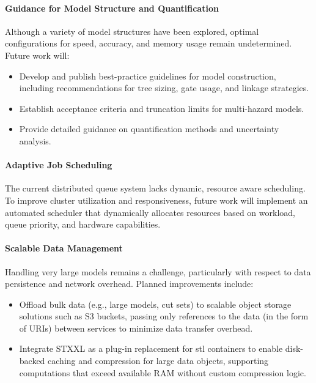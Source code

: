\paragraph{Guidance for Model Structure and Quantification}

Although a variety of model structures have been explored, optimal configurations for speed, accuracy, and memory usage remain undetermined. Future work will:
\begin{itemize}
    \item Develop and publish best-practice guidelines for model construction, including recommendations for tree sizing, gate usage, and linkage strategies.
    \item Establish acceptance criteria and truncation limits for multi-hazard models.
    \item Provide detailed guidance on quantification methods and uncertainty analysis.
\end{itemize}

\paragraph{Adaptive Job Scheduling}

The current distributed queue system lacks dynamic, resource aware scheduling. To improve cluster utilization and responsiveness, future work will implement an automated scheduler that dynamically allocates resources based on workload, queue priority, and hardware capabilities.

\paragraph{Scalable Data Management}

Handling very large models remains a challenge, particularly with respect to data persistence and network overhead. Planned improvements include:
\begin{itemize}
    \item Offload bulk data (e.g., large models, cut sets) to scalable object storage solutions such as S3 buckets, passing only references to the data (in the form of URIs) between services to minimize data transfer overhead.
    \item Integrate STXXL \cite{stxxl_external_memory} as a plug-in replacement for \acrshort{stl} containers to enable disk-backed caching and compression for large data objects, supporting computations that exceed available RAM without custom compression logic.
\end{itemize}

